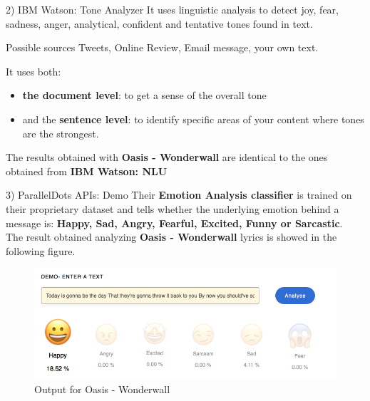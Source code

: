 \documentclass[xcolor=dvipsnames]{beamer}
\begin{document}
\begin{frame}{2) IBM Watson: Tone Analyzer}
It uses linguistic analysis to detect joy, fear, sadness, anger, analytical, confident and tentative tones found in text. \cite{p3}
\begin{block}{Possible sources}
Tweets, Online Review, Email message, your own text.
\end{block}
It uses both:
\begin{itemize}
\item \textbf{the document level}: to get a sense of the overall tone 
\item and the \textbf{sentence level}: to identify specific areas of your content where tones are the strongest.
\end{itemize}
The results obtained with \textbf{Oasis - Wonderwall} are identical to the ones obtained from \textbf{IBM Watson: NLU}
\end{frame}

\begin{frame}{3) ParallelDots APIs: Demo}
Their \textbf{Emotion Analysis classifier} is trained on their proprietary dataset and tells whether the underlying emotion behind a message is: \textbf{Happy, Sad, Angry, Fearful, Excited, Funny or Sarcastic}.\cite{p4}
\\The result obtained analyzing \textbf{Oasis - Wonderwall} lyrics is showed in the following figure. 
\begin{figure}
	\includegraphics[scale=0.3]{./images/pd_wonderwall}
	\caption{Output for Oasis - Wonderwall}
\end{figure}
\end{frame}
\end{document}
